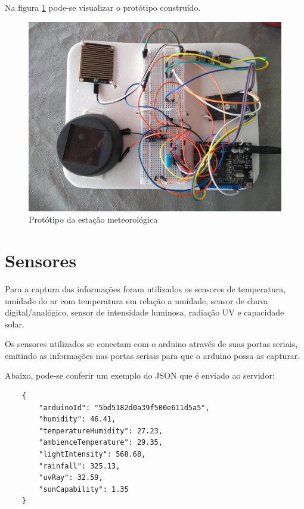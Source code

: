 Na figura \ref{fig:arduino_prototipo} pode-se visualizar o protótipo construído.

\begin{figure}[H]
    \centering
    \caption{Protótipo da estação meteorológica \label{fig:arduino_prototipo}}
    \includegraphics[scale=0.4]{arduino_prototipo.jpeg}
    \hfill
{}
\end{figure}

\section{Sensores}
\label{sec:sensores}

Para a captura das informações foram utilizados os sensores de temperatura, umidade do ar com temperatura em relação a umidade, sensor de chuva digital/analógico, sensor de intensidade luminosa, radiação UV e capacidade solar.

Os sensores utilizados se conectam com o arduino através de suas portas seriais, emitindo as informações nas portas seriais para que o arduino possa as capturar.

Abaixo, pode-se conferir um exemplo do JSON que é enviado ao servidor:

\pagebreak
\begin{lstlisting}
    {
        "arduinoId": "5bd5182d0a39f500e611d5a5",
        "humidity": 46.41,
        "temperatureHumidity": 27.23,
        "ambienceTemperature": 29.35,
        "lightIntensity": 568.68,
        "rainfall": 325.13,
        "uvRay": 32.59,
        "sunCapability": 1.35
    }
\end{lstlisting}

